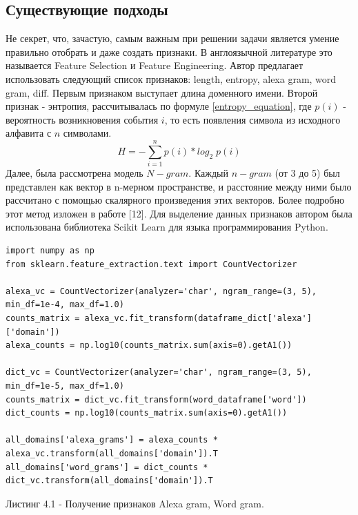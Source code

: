     \subsection{Существующие подходы}\label{be_class_exp}
    Не секрет, что, зачастую, самым важным при решении задачи является умение правильно отобрать и даже создать признаки. В англоязычной литературе это называется Feature Selection и Feature Engineering. Автор предлагает использовать следующий список признаков: length, entropy, alexa gram, word gram, diff.
    Первым признаком выступает длина доменного имени.
    Второй признак - энтропия, рассчитывалась по формуле \ref{entropy_equation}, где $p(i)$ - вероятность возникновения события $i$, то есть появления символа из исходного алфавита с $n$ символами.
    \begin{equation}\label{entropy_equation}
    H = - \sum_{i=1}^{n} p(i)*log_{2}\;p(i{})
    \end{equation}
    Далее, была рассмотрена модель $N-gram$. Каждый $n-gram$ (от 3 до 5) был представлен как вектор в n-мерном пространстве, и расстояние между ними было рассчитано с помощью скалярного произведения этих векторов. Более подробно этот метод изложен в работе [12].
    Для выделение данных признаков автором была использована библиотека Scikit Learn для языка программирования Python.
    \clearpage
    \begin{lstlisting}
import numpy as np
from sklearn.feature_extraction.text import CountVectorizer

alexa_vc = CountVectorizer(analyzer='char', ngram_range=(3, 5), min_df=1e-4, max_df=1.0)
counts_matrix = alexa_vc.fit_transform(dataframe_dict['alexa']['domain'])
alexa_counts = np.log10(counts_matrix.sum(axis=0).getA1())

dict_vc = CountVectorizer(analyzer='char', ngram_range=(3, 5), min_df=1e-5, max_df=1.0)
counts_matrix = dict_vc.fit_transform(word_dataframe['word'])
dict_counts = np.log10(counts_matrix.sum(axis=0).getA1())

all_domains['alexa_grams'] = alexa_counts * alexa_vc.transform(all_domains['domain']).T
all_domains['word_grams'] = dict_counts * dict_vc.transform(all_domains['domain']).T
    \end{lstlisting}
    Листинг 4.1 - Получение признаков Alexa gram, Word gram.


